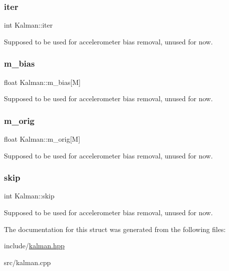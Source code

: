 \subsubsection{\texorpdfstring{iter}{iter}}
{\footnotesize\ttfamily int Kalman\+::iter}

Supposed to be used for accelerometer bias removal, unused for now. \mbox{\label{structKalman_ace399cd36d8df2e905562b5d0952d11f}} 
\subsubsection{\texorpdfstring{m\+\_\+bias}{m\_bias}}
{\footnotesize\ttfamily float Kalman\+::m\+\_\+bias\mbox{[}M\mbox{]}}

Supposed to be used for accelerometer bias removal, unused for now. \mbox{\label{structKalman_a1672e563d4e6cc8f23b3fb4d1c546fe8}} 
\subsubsection{\texorpdfstring{m\+\_\+orig}{m\_orig}}
{\footnotesize\ttfamily float Kalman\+::m\+\_\+orig\mbox{[}M\mbox{]}}

Supposed to be used for accelerometer bias removal, unused for now. \mbox{\label{structKalman_a79ded01709506f54e5e2ef5d0b1c5ddf}} 
\subsubsection{\texorpdfstring{skip}{skip}}
{\footnotesize\ttfamily int Kalman\+::skip}

Supposed to be used for accelerometer bias removal, unused for now. 

The documentation for this struct was generated from the following files\+:\begin{DoxyCompactItemize}
\item 
include/\hyperlink{kalman_8hpp}{kalman.\+hpp}\item 
src/kalman.\+cpp\end{DoxyCompactItemize}
